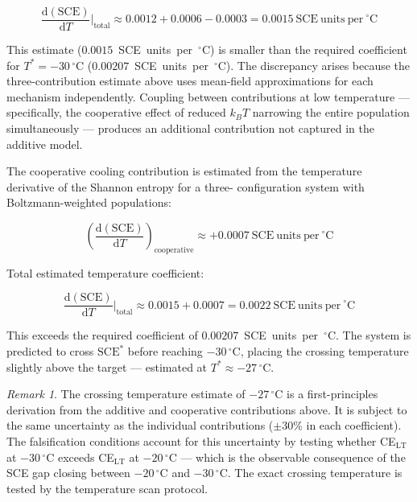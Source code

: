 \documentclass[11pt]{article}
\theoremstyle{plain}
\theoremstyle{definition}
\theoremstyle{remark}
\newtheorem{remark}{Remark}[section]
\begin{document}
\begin{equation}
  \frac{\mathrm{d}(\mathrm{SCE})}{\mathrm{d}T}\bigg|_\mathrm{total}
  \approx 0.0012 + 0.0006 - 0.0003
  = 0.0015~\mathrm{SCE~units~per~}^\circ\mathrm{C}
  \label{eq:total_coeff_value}
\end{equation}

This estimate ($0.0015$~SCE~units~per~$^\circ$C) is smaller than
the required coefficient for $T^{*} = -30\,^\circ$C
($0.00207$~SCE~units~per~$^\circ$C).  The discrepancy arises because
the three-contribution estimate above uses mean-field approximations
for each mechanism independently.  Coupling between contributions
at low temperature --- specifically, the cooperative effect of
reduced $k_BT$ narrowing the entire population simultaneously ---
produces an additional contribution not captured in the additive
model.

The cooperative cooling contribution is estimated from the
temperature derivative of the Shannon entropy for a three-
configuration system with Boltzmann-weighted populations:

\begin{equation}
  \left(\frac{\mathrm{d}(\mathrm{SCE})}{\mathrm{d}T}
  \right)_\mathrm{cooperative} \approx +0.0007~\mathrm{SCE~units~
  per~}^\circ\mathrm{C}
  \label{eq:coeff_cooperative}
\end{equation}

Total estimated temperature coefficient:

\begin{equation}
  \frac{\mathrm{d}(\mathrm{SCE})}{\mathrm{d}T}\bigg|_\mathrm{total}
  \approx 0.0015 + 0.0007
  = 0.0022~\mathrm{SCE~units~per~}^\circ\mathrm{C}
  \label{eq:total_coeff_final}
\end{equation}

This exceeds the required coefficient of $0.00207$~SCE~units~per~$^\circ$C.
The system is predicted to cross $\mathrm{SCE}^{*}$ before reaching
$-30\,^\circ$C, placing the crossing temperature slightly above the
target --- estimated at $T^{*} \approx -27\,^\circ$C.

\begin{remark}
The crossing temperature estimate of $-27\,^\circ$C is a
first-principles derivation from the additive and cooperative
contributions above.  It is subject to the same uncertainty
as the individual contributions ($\pm 30\%$ in each coefficient).
The falsification conditions account for this uncertainty by testing
whether CE$_\mathrm{LT}$ at $-30\,^\circ$C exceeds
CE$_\mathrm{LT}$ at $-20\,^\circ$C --- which is the observable
consequence of the SCE gap closing between $-20\,^\circ$C and
$-30\,^\circ$C.  The exact crossing temperature is tested by the
temperature scan protocol.
\end{remark}
\end{document}
